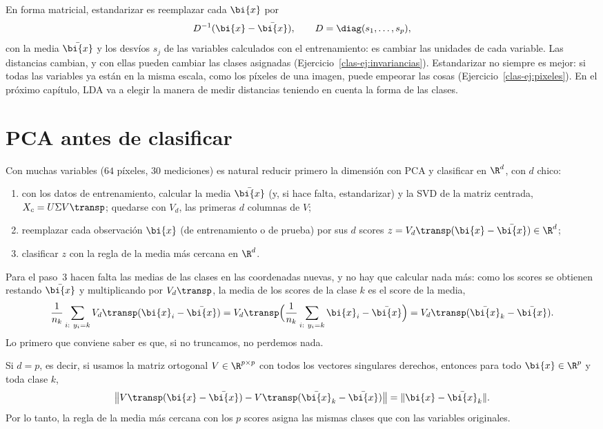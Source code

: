 En forma matricial, estandarizar es reemplazar cada $\bi{x}$ por
\[
D^{-1}(\bi{x}-\bar{\bi{x}}),\qquad D=\diag(s_1,\dots,s_p),
\]
con la media $\bar{\bi{x}}$ y los desvíos $s_j$ de las variables calculados con el
entrenamiento: es cambiar las unidades de cada variable. Las distancias
cambian, y con ellas pueden cambiar las clases asignadas
(Ejercicio~\ref{clas-ej:invariancias}). Estandarizar no siempre es mejor: si
todas las variables ya están en la misma escala, como los píxeles de una
imagen, puede empeorar las cosas (Ejercicio~\ref{clas-ej:pixeles}). En el
próximo capítulo, LDA va a elegir la manera de medir distancias teniendo en
cuenta la forma de las clases.

\section{PCA antes de clasificar}\label{clas-sec:pca}

Con muchas variables ($64$ píxeles, $30$ mediciones) es natural reducir
primero la dimensión con PCA y clasificar en $\R^d$, con $d$ chico:
\begin{enumerate}[leftmargin=*,itemsep=1pt]
\item con los datos de entrenamiento, calcular la media $\bar{\bi{x}}$ (y, si hace
falta, estandarizar) y la SVD de la matriz centrada, $X_c=U\Sigma V\transp$;
quedarse con $V_d$, las primeras $d$ columnas de $V$;
\item reemplazar cada observación $\bi{x}$ (de entrenamiento o de prueba) por sus
$d$ scores $z=V_d\transp(\bi{x}-\bar{\bi{x}})\in\R^d$;
\item clasificar $z$ con la regla de la media más cercana en $\R^d$.
\end{enumerate}
Para el paso~3 hacen falta las medias de las clases en las coordenadas
nuevas, y no hay que calcular nada más: como los scores se obtienen restando
$\bar{\bi{x}}$ y multiplicando por $V_d\transp$, la media de los scores de la clase
$k$ es el score de la media,
\[
\frac1{n_k}\sum_{i:\ y_i=k}V_d\transp(\bi{x}_i-\bar{\bi{x}})
=V_d\transp\Bigl(\frac1{n_k}\sum_{i:\ y_i=k}\bi{x}_i-\bar{\bi{x}}\Bigr)
=V_d\transp(\bar{\bi{x}}_k-\bar{\bi{x}}).
\]
Lo primero que conviene saber es que, si no truncamos, no perdemos nada.

\begin{proposition}\label{clas-prop:todas}
Si $d=p$, es decir, si usamos la matriz ortogonal $V\in\R^{p\times p}$ con
todos los vectores singulares derechos, entonces para todo $\bi{x}\in\R^p$ y toda
clase $k$,
\[
\bigl\|V\transp(\bi{x}-\bar{\bi{x}})-V\transp(\bar{\bi{x}}_k-\bar{\bi{x}})\bigr\|=\|\bi{x}-\bar{\bi{x}}_k\| .
\]
Por lo tanto, la regla de la media más cercana con los $p$ scores asigna las
mismas clases que con las variables originales.
\end{proposition}

